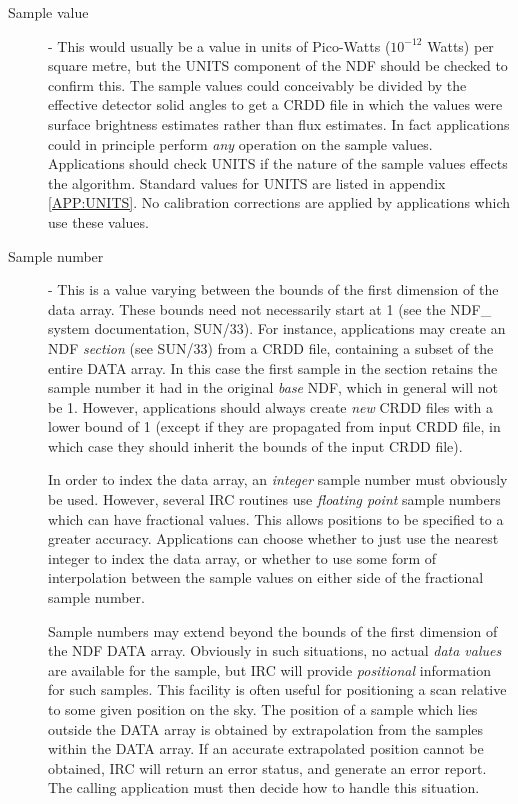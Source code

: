 \begin{description}

\item [Sample value] - This would usually be a value in units of Pico-Watts
($10^{-12}$ Watts) per square metre, but the UNITS component of the NDF should
be checked to confirm this. The sample values could conceivably be divided by
the effective detector solid angles to get a CRDD file in which the values were
surface brightness estimates rather than flux estimates. In fact applications
could in principle perform {\em any} operation on the sample values.
Applications should check UNITS if the nature of the sample values effects the
algorithm. Standard values for UNITS are listed in appendix \ref {APP:UNITS}. No
calibration corrections are applied by applications which use these values.

\item [Sample number] - This is a value varying between the bounds of the
first dimension of the data array. These bounds need not necessarily start at 1
(see the NDF\_ system documentation, SUN/33). For instance, applications may
create an NDF {\em section} (see SUN/33) from a CRDD file, containing a subset
of the entire DATA array. In this case the first sample in the section retains
the sample number it had in the original {\em base} NDF, which in general will
not be 1. However, applications should always create {\em new} CRDD files
with a lower bound of 1 (except if they are propagated from input CRDD file, in
which case they should inherit the bounds of the input CRDD file).

In order to index the data array, an {\em integer} sample number must obviously
be used. However, several IRC routines use {\em floating point} sample numbers
which can have fractional values. This allows positions to be specified to a
greater accuracy. Applications can choose whether to just use the nearest
integer to index the data array, or whether to use some form of interpolation
between the sample values on either side of the fractional sample number.

Sample numbers may extend beyond the bounds of the first dimension of the NDF
DATA array. Obviously in such situations, no actual {\em data values} are
available for the sample, but IRC will provide {\em positional} information for
such samples. This facility is often useful for positioning a scan relative to
some given position on the sky. The position of a sample which lies outside the
DATA array is obtained by extrapolation from the samples within the DATA array.
If an accurate extrapolated position cannot be obtained, IRC will return an
error status, and generate an error report. The calling application must then
decide how to handle this situation.


\end{description}
